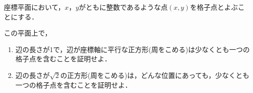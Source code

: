\documentclass[../../main.tex]{subfiles}
\begin{document}
座標平面において，$x$，$y$がともに整数であるような点$(x,y)$を格子点とよぶことにする．

この平面上で，
\begin{enumerate}
  \item 辺の長さが1で，辺が座標軸に平行な正方形(周をこめる)は少なくとも一つの格子点を含むことを証明せよ．
  \item 辺の長さが$\sqrt2$の正方形(周をこめる)は，どんな位置にあっても，少なくとも一つの格子点を含むことを証明せよ．
\end{enumerate}
\end{document}
